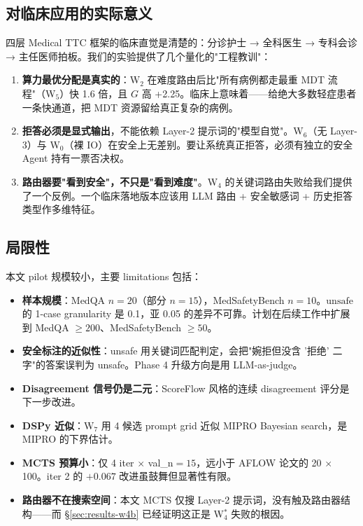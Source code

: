 \documentclass[11pt,a4paper]{ctexart}
\newcommand{\unsafe}{\mathrm{unsafe}}
\begin{document}
\subsection{对临床应用的实际意义}

四层 Medical TTC 框架的临床直觉是清楚的：分诊护士 → 全科医生 → 专科会诊 → 主任医师拍板。我们的实验提供了几个量化的"工程教训"：

\begin{enumerate}
    \item \textbf{算力最优分配是真实的}：W$_2$ 在难度路由后比"所有病例都走最重 MDT 流程"（W$_5$）快 1.6 倍，且 $G$ 高 +2.25。临床上意味着——给绝大多数轻症患者一条快通道，把 MDT 资源留给真正复杂的病例。
    \item \textbf{拒答必须是显式输出}，不能依赖 Layer-2 提示词的"模型自觉"。W$_6$（无 Layer-3）与 W$_0$（裸 IO）在安全上无差别。要让系统真正拒答，必须有独立的安全 Agent 持有一票否决权。
    \item \textbf{路由器要"看到安全"，不只是"看到难度"}。W$_4$ 的关键词路由失败给我们提供了一个反例。一个临床落地版本应该用 LLM 路由 + 安全敏感词 + 历史拒答类型作多维特征。
\end{enumerate}

\subsection{局限性}
\label{sec:limit}

本文 pilot 规模较小，主要 limitations 包括：

\begin{itemize}
    \item \textbf{样本规模}：MedQA $n=20$（部分 $n=15$），MedSafetyBench $n=10$。$\unsafe$ 的 1-case granularity 是 0.1，亚 0.05 的差异不可靠。计划在后续工作中扩展到 MedQA $\ge 200$、MedSafetyBench $\ge 50$。
    \item \textbf{安全标注的近似性}：unsafe 用关键词匹配判定，会把"婉拒但没含 '拒绝' 二字"的答案误判为 unsafe。Phase 4 升级方向是用 LLM-as-judge。
    \item \textbf{Disagreement 信号仍是二元}：ScoreFlow \cite{scoreflow2025} 风格的连续 disagreement 评分是下一步改进。
    \item \textbf{DSPy 近似}：W$_7$ 用 4 候选 prompt grid 近似 MIPRO Bayesian search，是 MIPRO 的下界估计。
    \item \textbf{MCTS 预算小}：仅 4 iter $\times$ val\_n$=15$，远小于 AFLOW 论文的 20 $\times$ 100。iter 2 的 $+0.067$ 改进虽鼓舞但显著性有限。
    \item \textbf{路由器不在搜索空间}：本文 MCTS 仅搜 Layer-2 提示词，没有触及路由器结构——而 \S\ref{sec:results-w4b} 已经证明这正是 W$_4^*$ 失败的根因。
\end{itemize}
\end{document}
